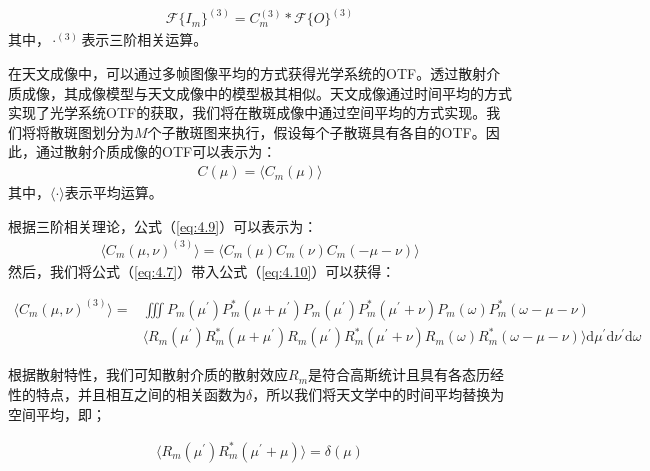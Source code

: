 \begin{equation}
\begin{aligned}
    \mathcal{F} \{ I_m \}^{(3)} = C_m^{(3)}*\mathcal{F}\{ O \}^{(3)}
\end{aligned}
\label{eq:4.8}
\end{equation}其中，$\cdot ^{(3)}$表示三阶相关运算。

在天文成像中，可以通过多帧图像平均的方式获得光学系统的OTF。透过散射介质成像，其成像模型与天文成像中的模型极其相似。天文成像通过时间平均的方式实现了光学系统OTF的获取，我们将在散斑成像中通过空间平均的方式实现。我们将将散斑图划分为$M$个子散斑图来执行，假设每个子散斑具有各自的OTF。因此，通过散射介质成像的OTF可以表示为：
\begin{equation}
\begin{aligned}
    C(\mu) = \langle C_m(\mu)  \rangle
\end{aligned}
\label{eq:4.9}
\end{equation}其中，$\langle \cdot  \rangle$表示平均运算。

根据三阶相关理论\cite{lohmann_speckle_1983,northcott_algorithms_1988}，公式（\ref{eq:4.9}）可以表示为：
\begin{equation}
\begin{aligned}
    \langle C_m(\mu,\nu)^{(3)} \rangle= \langle C_m(\mu) C_m(\nu) C_m(-\mu-\nu)  \rangle
\end{aligned}
\label{eq:4.10}
\end{equation}然后，我们将公式（\ref{eq:4.7}）带入公式（\ref{eq:4.10}）可以获得：

\begin{equation}
\begin{aligned}
    \langle C_m(\mu,\nu)^{(3)} \rangle= &\iiint P_{m}(\mu^{\prime}) P_{m}^{*}(\mu + \mu^{\prime}) P_{m}(\mu^{\prime}) P_{m}^{*}(\mu^{\prime} + \nu) P_{m}(\omega) P_{m}^{*}(\omega -\mu - \nu) \\ &\langle R_{m}(\mu^{\prime}) R_{m}^{*}(\mu + \mu^{\prime}) R_{m}(\mu^{\prime}) R_{m}^{*}(\mu^{\prime} + \nu) R_{m}(\omega) R_{m}^{*}(\omega -\mu - \nu) \rangle \mathrm{d}{\mu^{\prime}} \mathrm{d}{\nu^{\prime}} \mathrm{d}{\omega}
\end{aligned}
\label{eq:4.11}
\end{equation}

根据散射特性，我们可知散射介质的散射效应$R_{m}$是符合高斯统计且具有各态历经性的特点，并且相互之间的相关函数为$\delta$，所以我们将天文学中的时间平均替换为空间平均，即；

\begin{equation}
\begin{aligned}
    \langle R_{m}(\mu^{\prime}) R_{m}^{*}(\mu^{\prime}+\mu) \rangle= \delta(\mu)
\end{aligned}
\label{eq:4.12}
\end{equation}

